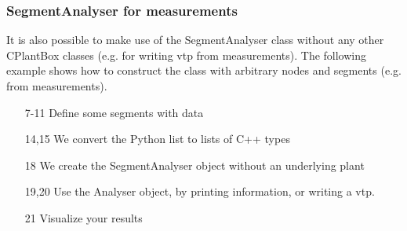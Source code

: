 \subsubsection*{SegmentAnalyser for measurements}

It is also possible to make use of the SegmentAnalyser class without any other CPlantBox classes (e.g. for writing vtp from measurements). The following example shows how to construct the class with arbitrary nodes and segments (e.g. from measurements). 



\begin{itemize}
 \item[7-11] Define some segments with data
 \item[14,15] We convert the Python list to lists of C++ types
 \item[18] We create the SegmentAnalyser object without an underlying plant
 \item[19,20] Use the Analyser object, by printing information, or writing a vtp. 
 \item[21] Visualize your results
\end{itemize}
